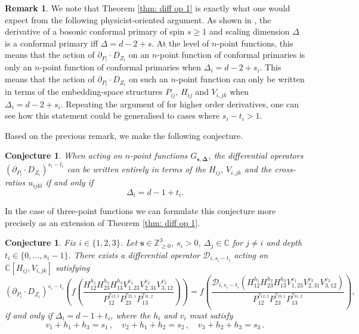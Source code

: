 \documentclass[12pt,a4paper]{extarticle}
\newtheorem{conjecture}[theorem]{Conjecture}
\theoremstyle{definition}
\newtheorem{remark}[theorem]{Remark}
\begin{document}
\begin{remark}
    We note that Theorem \ref{thm: diff op 1} is exactly what one would expect from the following physicist-oriented argument. As shown in \cite[p.~9-10]{Osborn}, the derivative of a bosonic conformal primary of spin $s\ge1$ and scaling dimension $\Delta$ is a conformal primary iff $\Delta=d-2+s$. At the level of $n$-point functions, this means that the action of $\partial_{P_i}\cdot D_{Z_i}$ on an $n$-point function of conformal primaries is only an $n$-point function of conformal primaries when $\Delta_i=d-2+s_i$. This means that the action of $\partial_{P_i}\cdot D_{Z_i}$ on such an $n$-point function can only be written in terms of the embedding-space structures $P_{ij},\, H_{ij}$ and $V_{i,jk}$ when $\Delta_i=d-2+s_i$. 
    Repeating the argument of \cite{Osborn} for higher order derivatives, one can see how this statement could be generalised to cases where $s_i-t_i>1$.
\end{remark}
Based on the previous remark, we make the following conjecture.
\begin{conjecture}\label{conj: higher order derivative}
    When acting on $n$-point functions $G_{\mathbf{s},\mathbf{\Delta}}$, the differential operators ${(\partial_{P_i}\cdot D_{Z_i})^{s_i-t_i}}$ can be written entirely in terms of the $H_{ij}$, $V_{i,jk}$ and the cross-ratios $u_{ijkl}$ if and only if $$\Delta_i=d-1+t_i.$$
\end{conjecture}
In the case of three-point functions we can formulate this conjecture more precisely as an extension of Theorem \ref{thm: diff op 1}.
\begin{conjecture}\label{conj: 3point diff op conjecture}
    Fix $i\in\{1,2,3\}$. Let $\mathbf{s}\in\mathbb{Z}_{\geq 0}^3$, $s_i>0$, $\Delta_{j}\in\mathbb{C}$ for $j\neq i$ and depth $t_i\in\{0,\ldots,s_i-1\}$. There exists a differential operator $\mathcal{D}_{i,s_i-t_i}$ acting on $\mathbb{C}[H_{ij},V_{i,jk}]$ satisfying
    \begin{equation*}
    (\partial_{P_i}\cdot D_{Z_i})^{s_i-t_i}\left(f\left(\frac{H^{h_{1}}_{12}H^{h_{2}}_{23}H^{h_{3}}_{13}V^{v_1}_{1,23}V^{v_2}_{2,31}V^{v_3}_{3,12}}{P^{\tau_{12,3}}_{12}P^{\tau_{23,1}}_{23}P^{\tau_{31,2}}_{13}}\right)\right)=f\left(\frac{\mathcal{D}_{i,s_i-t_i}(H^{h_1}_{12}H^{h_2}_{23}H^{h_3}_{13}V^{v_1}_{1,23}V^{v_2}_{2,31}V^{v_3}_{3,12})}{P^{\tau_{12,3}}_{12}P^{\tau_{23,1}}_{23}P^{\tau_{31,2}}_{13}}\right),
    \end{equation*}
    if and only if $\Delta_i=d-1+t_i$, where the $h_i$ and $v_i$ must satisfy
    \begin{equation*}
        v_1+h_1+h_3=s_1\,,\quad
        v_2+h_1+h_2=s_2\,,\quad 
        v_3+h_2+h_3=s_3\,.
    \end{equation*}
\end{conjecture}
\end{document}
